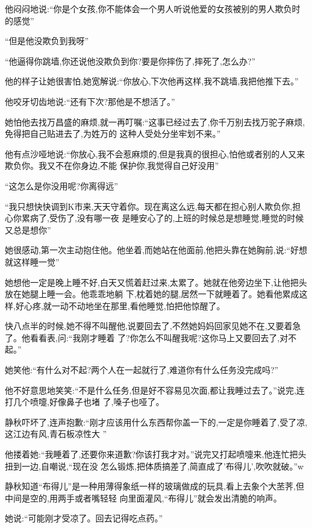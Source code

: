 ﻿\documentclass[12pt]{article}
\begin{document}
他闷闷地说:``你是个女孩,你不能体会一个男人听说他爱的女孩被别的男人欺负时的感觉\myrule ''

``但是他没欺负到我呀\myrule ''

``他逼得你跳墙,你还说他没欺负到你?要是你摔伤了,摔\myrule 死了,怎么办?''

他的样子让她很害怕,她宽解说:``你放心,下次他再这样,我不跳墙,我把他推下去。''

他咬牙切齿地说:``还有下次?那他是不想活了。''


她怕他去找万昌盛的麻烦,就一再叮嘱:``这事已经过去了,你千万别去找万驼子麻烦,免得把自己贴进去了,为姓万的
这种人受处分坐牢划不来。''

他有点沙哑地说:``你放心,我不会惹麻烦的,但是我真的很担心,怕他或者别的人又来欺负你。我又不在你身边,不能
保护你,我觉得自己好没用\myrule ''

``这怎么是你没用呢?你离得远\myrule ''

``我只想快快调到K市来,天天守着你。现在离这么远,每天都在担心别人欺负你,担心你累病了,受伤了,没有哪一夜
是睡安心了的,上班的时候总是想睡觉,睡觉的时候又总是想\myrule 你\myrule ''

她很感动,第一次主动抱住他。他坐着,而她站在他面前,他把头靠在她胸前,说:``好想就这样睡一觉\myrule ''

她想他一定是晚上睡不好,白天又慌着赶过来,太累了。她就在他旁边坐下,让他把头放在她腿上睡一会。他乖乖地躺
下,枕着她的腿,居然一下就睡着了。她看他累成这样,好心疼,就一动不动地坐在那里,看他睡觉,怕把他惊醒了。

快八点半的时候,她不得不叫醒他,说要回去了,不然她妈妈回家见她不在,又要着急了。他看看表,问:``我刚才睡着
了?你怎么不叫醒我呢?这\myrule 你马上又要回去了\myrule ,对不起。''

她笑他:``有什么对不起?两个人在一起就行了,难道你有什么任务没完成吗?''

他不好意思地笑笑:``不是什么任务,但是好不容易见次面,都让我睡过去了。''说完,连打几个喷嚏,好像鼻子也堵
了,嗓子也哑了。

静秋吓坏了,连声抱歉:``刚才应该用什么东西帮你盖一下的,一定是你睡着了,受了凉,这江边有风,青石板凉性大
\myrule ''

他搂着她:``我睡着了,还要你来道歉?你该打我才对。''说完又打起喷嚏来,他连忙把头扭到一边,自嘲说,``现在没
怎么锻炼,把体质搞差了,简直成了'布得儿',吹吹就破。''w

静秋知道``布得儿''是一种用薄得象纸一样的玻璃做成的玩具,看上去象个大苤荠,但中间是空的,用两手或者嘴轻轻
向里面灌风,``布得儿''就会发出清脆的响声。

她说:``可能刚才受凉了。回去记得吃点药。''
\end{document}

